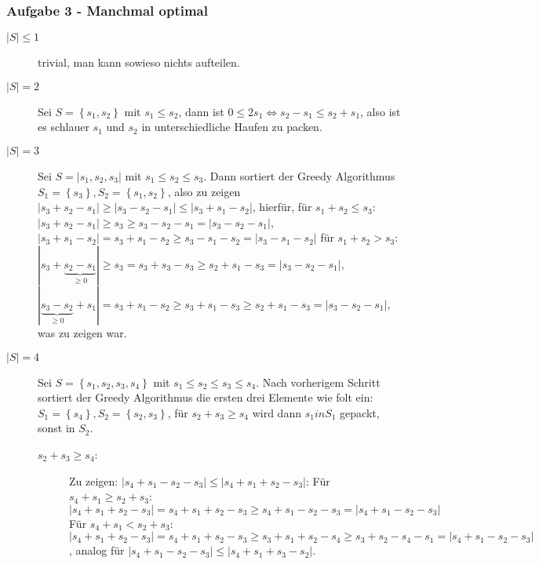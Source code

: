 \documentclass[11pt]{scrartcl}
\newcommand{\task}[1]{\subsubsection*{#1}}
\begin{document}
\task{Aufgabe 3 - Manchmal optimal}
\begin{description}
	\item[$ \left| S \right| \leq 1 $] trivial, man kann sowieso nichts aufteilen.
	\item[$ \left| S \right| = 2 $] Sei $ S = \left\{ s_1, s_2 \right\}  $ mit $ s_1 \leq  s_2 $, dann ist $ 0 \leq 2 s_1 \iff s_2 - s_1 \leq s_2 + s_1 $, also ist es schlauer $ s_1 $ und $ s_2 $ in unterschiedliche Haufen zu packen.
	\item[$ \left| S \right| = 3 $] Sei $ S = \left| s_1, s_2, s_3 \right|  $ mit $ s_1 \leq s_2 \leq s_3 $.
		Dann sortiert der Greedy Algorithmus $ S_1 = \left\{ s_3 \right\} , S_2 = \left\{ s_1, s_2 \right\}  $, also zu zeigen
		$ \left| s_3 + s_2 - s_1 \right| \geq   \left| s_3 - s_2 - s_1 \right| \leq \left| s_3 + s_1 - s_2 \right| $,
		hierfür, für $ s_1 + s_2 \leq  s_3 $:
		$ \left| s_3 + s_2 - s_1 \right| \geq s_3 \geq s_3 - s_2 - s_1 = \left| s_3 - s_2 - s_1 \right|   $,
		$ \left| s_3 + s_1 - s_2 \right| = s_3 + s_1 - s_2 \geq s_3 - s_1 - s_2 = \left| s_3 - s_1 - s_2 \right|  $
		für $ s_1 + s_2 > s_3 $:
		$ | s_3 + \underbrace{s_2 - s_1}_{\geq 0} | \geq s_3 = s_3 + s_3 - s_3 \geq s_2 + s_1 - s_3 = \left| s_3 - s_2 - s_1 \right|   $,
		$ | \underbrace{s_3 - s_2}_{\geq 0} + s_1 | = s_3 + s_1 - s_2 \geq s_3 + s_1 - s_3 \geq s_2 + s_1 - s_3 = \left| s_3 - s_2 - s_1 \right| $, was zu zeigen war.
	\item[$ \left| S \right| = 4 $]
		Sei $ S = \left\{ s_1, s_2, s_3, s_4 \right\}  $ mit $ s_1 \leq s_2 \leq s_3 \leq s_4 $.
		Nach vorherigem Schritt sortiert der Greedy Algorithmus die ersten drei Elemente wie folt ein:
		$ S_1 = \left\{ s_4 \right\} , S_2 = \left\{ s_2, s_3 \right\}  $, für $ s_2 + s_3 \geq s_4 $ wird dann $ s_1 in S_1 $ gepackt, sonst in $ S_2 $.
		\begin{description}
			\item[$ s_2 + s_3 \geq s_4 $:] 
				Zu zeigen: $ \left| s_4 + s_1 - s_2 - s_3 \right| \leq | s_4 + s_1 + s_2 - s_3 | $:
				Für $ s_4 + s_1 \geq s_2 + s_3 $:
				$ \left| s_4 + s_1 + s_2 - s_3 \right| = s_4 + s_1 + s_2 - s_3 \geq s_4 + s_1 - s_2 - s_3 = \left| s_4 + s_1 - s_2 - s_3 \right|  $\\
				Für $ s_4 + s_1 < s_2 + s_3 $:
				$ \left| s_4 + s_1 + s_2 - s_3 \right| = s_4 + s_1 + s_2 - s_3 \geq s_3 + s_1 + s_2 - s_4 \geq s_3 + s_2 - s_4 - s_1 = \left| s_4 + s_1 - s_2 - s_3 \right|  $, analog für $ \left| s_4 + s_1 - s_2 - s_3 \right| \leq \left| s_4 + s_1 + s_3 - s_2 \right| $.\\

\end{description}
\end{description}
\end{document}
